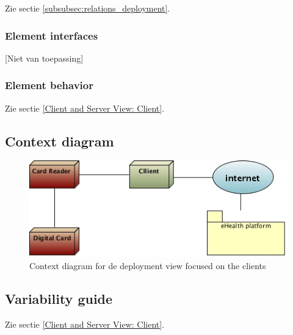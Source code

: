\documentclass[a4paper,10pt]{article}
\begin{document}
Zie sectie \ref{subsubsec:relations_deployment}.

\subsubsection{Element interfaces}

[Niet van toepassing]

\subsubsection{Element behavior}

Zie sectie \ref{Client and Server View: Client}.

\subsection{Context diagram}

\begin{center}
    \begin{figure}[!h]
      \includegraphics[width=\textwidth]{../images/deployment_clients_context.jpg}
	\caption{Context diagram for de deployment view focused on the clients}
    \end{figure}
  \end{center}

\subsection{Variability guide}
Zie sectie \ref{Client and Server View: Client}.
\end{document}
